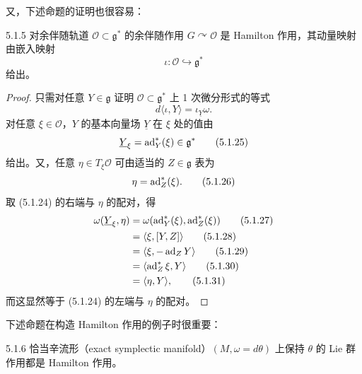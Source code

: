 又，下述命题的证明也很容易：

\begin{proposition*}{5.1.5}
  对余伴随轨道 $\mathcal{O}\subset\mathfrak{g}^*$ 的余伴随作用 $G\curvearrowright\mathcal{O}$ 是 Hamilton 作用，其动量映射由嵌入映射
  \begin{equation}
    \iota\colon\mathcal{O}\hookrightarrow\mathfrak{g}^*
    \tag{5.1.23}
  \end{equation}
  给出。
\end{proposition*}

\begin{proof}
  只需对任意 $Y\in\mathfrak{g}$ 证明 $\mathcal{O}\subset\mathfrak{g}^*$ 上 1 次微分形式的等式
  \begin{equation}
    d\langle\iota,Y\rangle=\iota_{\underline{Y}}\omega.
    \tag{5.1.24}
  \end{equation}
  对任意 $\xi\in\mathcal{O}$，$Y$ 的基本向量场 $\underline{Y}$ 在 $\xi$ 处的值由
  \begin{equation}
    \underline{Y}_{\xi}=\operatorname{ad}^*_Y(\xi)\in\mathfrak{g}^*
    \tag{5.1.25}
  \end{equation}
  给出。又，任意 $\eta\in T_{\xi}\mathcal{O}$ 可由适当的 $Z\in\mathfrak{g}$ 表为
  \begin{equation}
    \eta=\operatorname{ad}^*_Z(\xi).
    \tag{5.1.26}
  \end{equation}
  取 (5.1.24) 的右端与 $\eta$ 的配对，得
  \begin{align}
    \omega(\underline{Y}_{\xi},\eta)&=\omega(\operatorname{ad}^*_Y(\xi),\operatorname{ad}^*_Z(\xi)) \tag{5.1.27}\\
    &=\langle\xi,[Y,Z]\rangle \tag{5.1.28}\\
    &=\langle\xi,-\operatorname{ad}_ZY\rangle \tag{5.1.29}\\
    &=\langle\operatorname{ad}^*_Z\xi,Y\rangle \tag{5.1.30}\\
    &=\langle\eta,Y\rangle, \tag{5.1.31}
  \end{align}
  而这显然等于 (5.1.24) 的左端与 $\eta$ 的配对。
\end{proof}

下述命题在构造 Hamilton 作用的例子时很重要：

\begin{proposition*}{5.1.6}
  恰当辛流形（exact symplectic manifold）$(M,\omega=d\theta)$ 上保持 $\theta$ 的 Lie 群作用都是 Hamilton 作用。
\end{proposition*}

